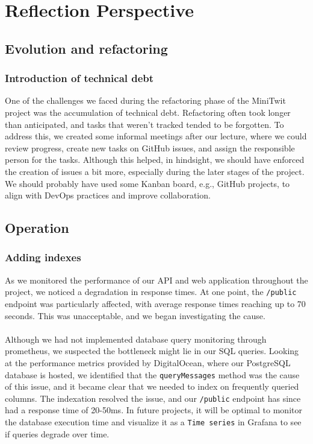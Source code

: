 \section{Reflection Perspective}
\subsection{Evolution and refactoring}
\subsubsection{Introduction of technical debt}
One of the challenges we faced during the refactoring phase of the MiniTwit project was the accumulation of technical debt. Refactoring often took longer than anticipated, and tasks that weren’t tracked tended to be forgotten. To address this, we created some informal meetings after our lecture, where we could review progress, create new tasks on GitHub issues, and assign the responsible person for the tasks. Although this helped, in hindsight, we should have enforced the creation of issues a bit more, especially during the later stages of the project. We should probably have used some Kanban board, e.g., GitHub projects, to align with DevOps practices \cite{devopsculture} and improve collaboration.

\subsection{Operation}\label{operation}
\subsubsection{Adding indexes}
As we monitored the performance of our API and web application throughout the project, we noticed a degradation in response times. At one point, the \texttt{/public} endpoint was particularly affected, with average response times reaching up to 70 seconds. This was unacceptable, and we began investigating the cause.
\\\\
Although we had not implemented database query monitoring through prometheus, we suspected the bottleneck might lie in our SQL queries. Looking at the performance metrics provided by DigitalOcean, where our PostgreSQL database is hosted, we identified that the \texttt{queryMessages} method was the cause of this issue, and it became clear that we needed to index on frequently queried columns. The indexation resolved the issue, and our \texttt{/public} endpoint has since had a response time of 20-50ms. In future projects, it will be optimal to monitor the database execution time and visualize it as a \texttt{Time series} in Grafana to see if queries degrade over time.

